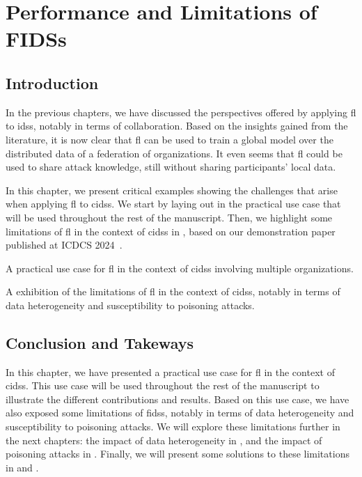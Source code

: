\chapter{Performance and Limitations of FIDSs\label{chap:application}}

\section{Introduction\label{sec:app.intro}}

In the previous chapters, we have discussed the perspectives offered by applying \gls{fl} to \glspl{ids}, notably in terms of collaboration.
Based on the insights gained from the literature, it is now clear that \gls{fl} can be used to train a global model over the distributed data of a federation of organizations.
It even seems that \gls{fl} could be used to share attack knowledge, still without sharing participants' local data.

In this chapter, we present critical examples showing the challenges that arise when applying \gls{fl} to \glspl{cids}.
We start by laying out in  the practical use case that will be used throughout the rest of the manuscript.
Then, we highlight some limitations of \gls{fl} in the context of \glspl{cids} in , based on our demonstration paper published at ICDCS 2024~\cite{lavaur_icdcs_demo_2024}.

\begin{contribs}
  \item A practical use case for \gls{fl} in the context of \glspl{cids} involving multiple organizations.
  \item A exhibition of the limitations of \gls{fl} in the context of \glspl{cids}, notably in terms of data heterogeneity and susceptibility to poisoning attacks.  
\end{contribs}





%


\section{Conclusion and Takeways\label{sec:app.conclusion}}

In this chapter, we have presented a practical use case for \gls{fl} in the context of \glspl{cids}.
This use case will be used throughout the rest of the manuscript to illustrate the different contributions and results.
Based on this use case, we have also exposed some limitations of \glspl{fids}, notably in terms of data heterogeneity and susceptibility to poisoning attacks.
We will explore these limitations further in the next chapters: the impact of data heterogeneity in , and the impact of poisoning attacks in .
Finally, we will present some solutions to these limitations in  and .